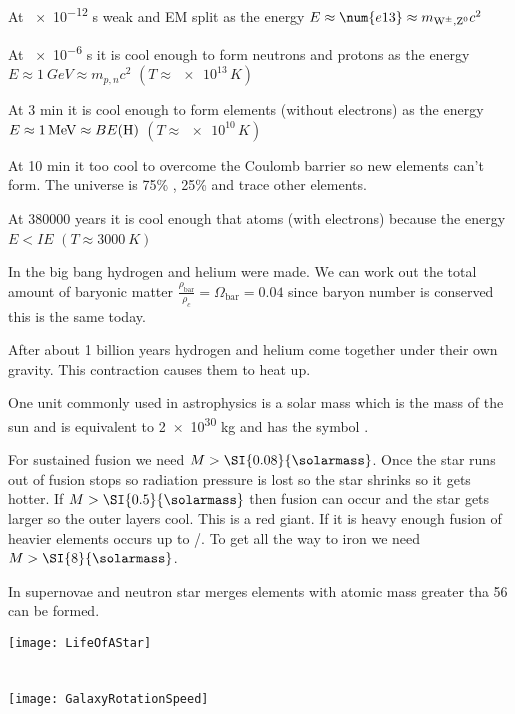 At \num{e-12} \si{s} weak and EM split as the energy \(E\approx\num{e13}\approx m_{\wpm,\zboson}c^2\)

At \num{e-6} \si{s} it is cool enough to form neutrons and protons as the energy \(E\approx\SI{1}{GeV}\approx m_{p,n}c^2\) \((T\approx\num{e13}\,\si{K})\)

At 3 min it is cool enough to form elements (without electrons) as the energy \(E\approx\SI{1}{MeV}\approx BE(\ce{H})\) \((T\approx\num{e10}\,\si{K})\)

At 10 min it too cool to overcome the Coulomb barrier so new elements can't form. The universe is 75\% , 25\%  and trace other elements.

At 380000 years it is cool enough that atoms (with electrons) because the energy \(E<IE\) \((T\approx\SI{3000}{K})\)

In the big bang hydrogen and helium were made. We can work out the total amount of baryonic matter \(\frac{\rho_{\mathrm{bar}}}{\rho_c}=\Omega_{\mathrm{bar}}=0.04\) since baryon number is conserved this is the same today.

After about 1 billion years hydrogen and helium come together under their own gravity. This contraction causes them to heat up.

One unit commonly used in astrophysics is a solar mass which is the mass of the sun and is equivalent to \num{2e30} \si{kg} and has the symbol \si{\solarmass}.

For sustained  fusion we need \(M>\SI{0.08}{\solarmass}\). Once the star runs out of  fusion stops so radiation pressure is lost so the star shrinks so it gets hotter. If \(M>\SI{0.5}{\solarmass}\) then  fusion can occur and the star gets larger so the outer layers cool. This is a red giant. If it is heavy enough fusion of heavier elements occurs up to /. To get all the way to iron we need \(M>\SI{8}{\solarmass}\).

In supernovae and neutron star merges elements with atomic mass greater tha 56 can be formed.

\begin{center}
\texttt{[image: LifeOfAStar]}
\end{center}

\section{}

\begin{center}
\texttt{[image: GalaxyRotationSpeed]}
\end{center}

